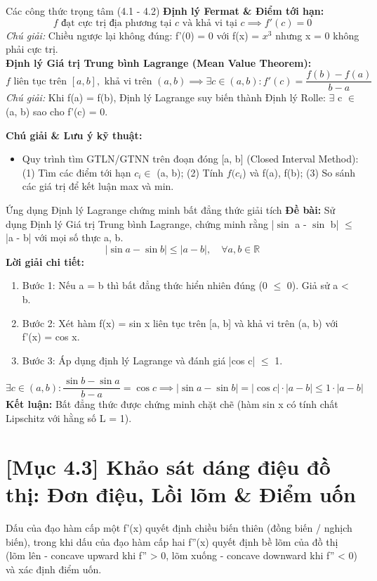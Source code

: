 \documentclass[11pt,a4paper,oneside]{book}
\begin{document}
\begin{congthuc}{Các công thức trọng tâm (4.1 - 4.2)}
\noindent\textbf{Định lý Fermat \& Điểm tới hạn:}
\[ f \text{ đạt cực trị địa phương tại } c \text{ và khả vi tại } c \implies f'(c) = 0 \]
\noindent\textit{Chú giải:} Chiều ngược lại không đúng: f'(0) = 0 với f(x) = $x^3$ nhưng x = 0 không phải cực trị.\\[4pt]
\noindent\textbf{Định lý Giá trị Trung bình Lagrange (Mean Value Theorem):}
\[ f \text{ liên tục trên } [a,b], \text{ khả vi trên } (a,b) \implies \exists c \in (a,b) : f'(c) = \frac{f(b) - f(a)}{b - a} \]
\noindent\textit{Chú giải:} Khi f(a) = f(b), Định lý Lagrange suy biến thành Định lý Rolle: $\exists$ c $\in$  (a, b) sao cho f'(c) = 0.\\[4pt]
\end{congthuc}

\noindent\textbf{Chú giải \& Lưu ý kỹ thuật:}
\begin{itemize}[leftmargin=1.5em, itemsep=2pt]
  \item Quy trình tìm GTLN/GTNN trên đoạn đóng [a, b] (Closed Interval Method): (1) Tìm các điểm tới hạn $c_i \in$  (a, b); (2) Tính $f(c_i$) và f(a), f(b); (3) So sánh các giá trị để kết luận max và min.
\end{itemize}

\begin{vidu}{Ứng dụng Định lý Lagrange chứng minh bất đẳng thức giải tích}
\textbf{Đề bài:} Sử dụng Định lý Giá trị Trung bình Lagrange, chứng minh rằng |$\sin$ a - $\sin$ b| $\le$ |a - b| với mọi số thực a, b.
\[ |\sin a - \sin b| \le |a - b|, \quad \forall a, b \in \mathbb{R} \]
\textbf{Lời giải chi tiết:}
\begin{enumerate}[leftmargin=1.5em, itemsep=2pt]
  \item Bước 1: Nếu a = b thì bất đẳng thức hiển nhiên đúng (0 $\le$  0). Giả sử a < b.
  \item Bước 2: Xét hàm f(x) = sin x liên tục trên [a, b] và khả vi trên (a, b) với f'(x) = cos x.
  \item Bước 3: Áp dụng định lý Lagrange và đánh giá |cos c| $\le$  1.
\end{enumerate}
\[ \exists c \in (a, b) : \frac{\sin b - \sin a}{b - a} = \cos c \implies |\sin a - \sin b| = |\cos c| \cdot |a - b| \le 1 \cdot |a - b| \]
\noindent\textbf{Kết luận:} Bất đẳng thức được chứng minh chặt chẽ (hàm sin x có tính chất Lipschitz với hằng số L = 1).
\end{vidu}

\section{[Mục 4.3] Khảo sát dáng điệu đồ thị: Đơn điệu, Lồi lõm \& Điểm uốn}
Dấu của đạo hàm cấp một f'(x) quyết định chiều biến thiên (đồng biến / nghịch biến), trong khi dấu của đạo hàm cấp hai f''(x) quyết định bề lõm của đồ thị (lõm lên - concave upward khi f'' > 0, lõm xuống - concave downward khi f'' < 0) và xác định điểm uốn.
\end{document}
